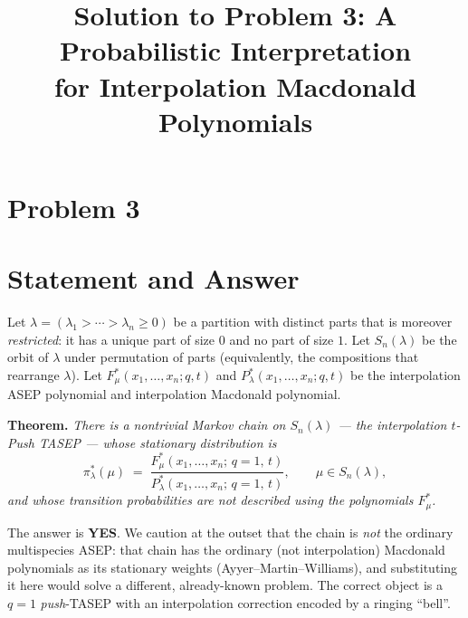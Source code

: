 \documentclass[11pt]{article}
\begin{document}
\endgroup

\clearpage
\section*{Problem 3}
\begingroup
\hypersetup{colorlinks=true,
            linkcolor=blue!50!black,
            citecolor=blue!50!black,
            urlcolor=blue!50!black}
\newcommand{\qthreeR}{\mathbb{R}}
\newcommand{\qthreeN}{\mathbb{N}}
\newcommand{\qthreeZ}{\mathbb{Z}}
\newcommand{\qthreeSnl}{S_n(\lambda)}
\newcommand{\qthreewt}{\operatorname{wt}}
\newtheorem{qthreetheorem}{Theorem}
\newtheorem{qthreelemma}{Lemma}
\newtheorem{qthreeproposition}{Proposition}
\newtheorem{qthreecorollary}{Corollary}
\theoremstyle{definition}
\newtheorem{qthreedefinition}{Definition}
\newtheorem{qthreeremark}{Remark}
\title{Solution to Problem 3: A Probabilistic Interpretation\\
for Interpolation Macdonald Polynomials}
\author{}
\date{}
\maketitle


\section*{Statement and Answer}

Let $\lambda=(\lambda_1>\cdots>\lambda_n\ge0)$ be a partition with distinct
parts that is moreover \emph{restricted}: it has a unique part of size $0$ and no
part of size $1$. Let $\qthreeSnl$ be the orbit of $\lambda$ under permutation of
parts (equivalently, the compositions that rearrange $\lambda$). Let
$F^*_\mu(x_1,\dots,x_n;q,t)$ and $P^*_\lambda(x_1,\dots,x_n;q,t)$ be the
interpolation ASEP polynomial and interpolation Macdonald polynomial.

\medskip
\noindent\textbf{Theorem.} \emph{There is a nontrivial Markov chain on $\qthreeSnl$ ---
the \emph{interpolation $t$-Push TASEP} --- whose stationary distribution is}
\[
\pi^*_\lambda(\mu)\;=\;\frac{F^*_\mu(x_1,\dots,x_n;\,q=1,\,t)}{P^*_\lambda(x_1,\dots,x_n;\,q=1,\,t)},
\qquad \mu\in\qthreeSnl,
\]
\emph{and whose transition probabilities are not described using the
polynomials $F^*_\mu$.}

\medskip
\noindent The answer is \textbf{YES}. We caution at the outset that the chain is
\emph{not} the ordinary multispecies ASEP: that chain has the ordinary (not
interpolation) Macdonald polynomials as its stationary weights (Ayyer--Martin--Williams),
and substituting it here would solve a different, already-known problem. The
correct object is a $q=1$ \emph{push}-TASEP with an interpolation correction
encoded by a ringing ``bell''.
\end{document}

